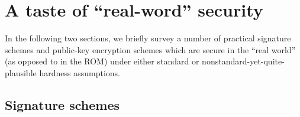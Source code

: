 \chapter{A taste of ``real-word'' security}
\label{CH:Realworld}

In the following two sections, we briefly survey a number of practical
signature schemes and public-key encryption schemes which are  secure in the
``real world'' (as opposed to in the ROM) under either standard or
nonstandard-yet-quite-plausible hardness assumptions.

\section{Signature schemes}
\label{SEC:SigSchemes}


